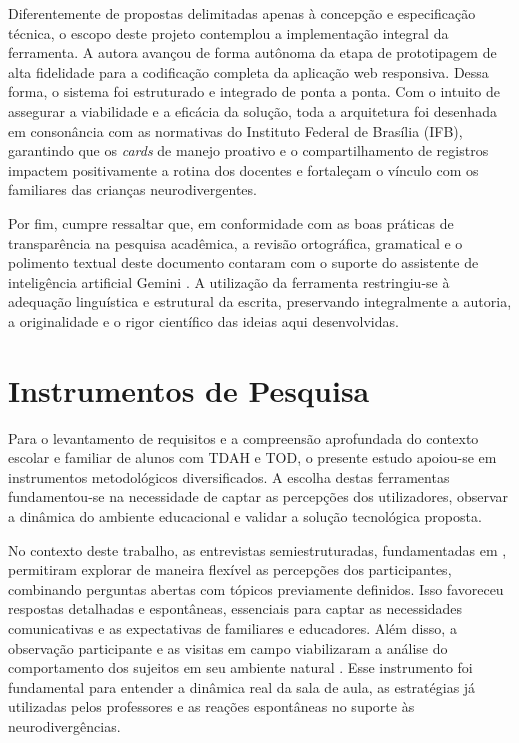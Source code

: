 Diferentemente de propostas delimitadas apenas à concepção e especificação técnica, o escopo deste projeto contemplou a implementação integral da ferramenta. A autora avançou de forma autônoma da etapa de prototipagem de alta fidelidade para a codificação completa da aplicação web responsiva. Dessa forma, o sistema foi estruturado e integrado de ponta a ponta. Com o intuito de assegurar a viabilidade e a eficácia da solução, toda a arquitetura foi desenhada em consonância com as normativas do Instituto Federal de Brasília (IFB), garantindo que os \textit{cards} de manejo proativo e o compartilhamento de registros impactem positivamente a rotina dos docentes e fortaleçam o vínculo com os familiares das crianças neurodivergentes.

Por fim, cumpre ressaltar que, em conformidade com as boas práticas de transparência na pesquisa acadêmica, a revisão ortográfica, gramatical e o polimento textual deste documento contaram com o suporte do assistente de inteligência artificial Gemini \cite{google2026gemini}. A utilização da ferramenta restringiu-se à adequação linguística e estrutural da escrita, preservando integralmente a autoria, a originalidade e o rigor científico das ideias aqui desenvolvidas.

\vspace{0.5cm}
\section{Instrumentos de Pesquisa}

Para o levantamento de requisitos e a compreensão aprofundada do contexto escolar e familiar de alunos com TDAH e TOD, o presente estudo apoiou-se em instrumentos metodológicos diversificados. A escolha destas ferramentas fundamentou-se na necessidade de captar as percepções dos utilizadores, observar a dinâmica do ambiente educacional e validar a solução tecnológica proposta. 

No contexto deste trabalho, as entrevistas semiestruturadas, fundamentadas em , permitiram explorar de maneira flexível as percepções dos participantes, combinando perguntas abertas com tópicos previamente definidos. Isso favoreceu respostas detalhadas e espontâneas, essenciais para captar as necessidades comunicativas e as expectativas de familiares e educadores. Além disso, a observação participante e as visitas em campo viabilizaram a análise do comportamento dos sujeitos em seu ambiente natural \cite{creswell2014}. Esse instrumento foi fundamental para entender a dinâmica real da sala de aula, as estratégias já utilizadas pelos professores e as reações espontâneas no suporte às neurodivergências.


